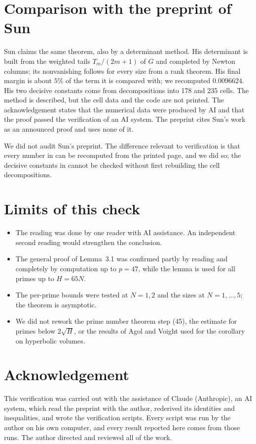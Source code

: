 \documentclass[11pt]{article}
\begin{document}
\section{Comparison with the preprint of Sun}

Sun \cite{Sun} claims the same theorem, also by a determinant method. His determinant is built from the weighted tails $T_m/(2m+1)$ of $G$ and completed by Newton columns; its nonvanishing follows for every size from a rank theorem. His final margin is about $5\%$ of the term it is compared with; we recomputed $0.0096624$. His two decisive constants come from decompositions into 178 and 235 cells. The method is described, but the cell data and the code are not printed. The acknowledgement states that the numerical data were produced by AI and that the proof passed the verification of an AI system. The preprint \cite{OAI} cites Sun's work as an announced proof and uses none of it.

We did not audit Sun's preprint. The difference relevant to verification is that every number in \cite{OAI} can be recomputed from the printed page, and we did so; the decisive constants in \cite{Sun} cannot be checked without first rebuilding the cell decompositions.

\section{Limits of this check}
\label{sec:limits}

\begin{itemize}
\item The reading was done by one reader with AI assistance. An independent second reading would strengthen the conclusion.
\item The general proof of Lemma~3.1 was confirmed partly by reading and completely by computation up to $p=47$, while the lemma is used for all primes up to $H=65N$.
\item The per-prime bounds were tested at $N=1,2$ and the sizes at $N=1,\dots,5$; the theorem is asymptotic.
\item We did not rework the prime number theorem step (45), the estimate for primes below $2\sqrt{H}$, or the results of Agol \cite{Agol} and Voight \cite{Voight} used for the corollary on hyperbolic volumes.
\end{itemize}

\section*{Acknowledgement}
This verification was carried out with the assistance of Claude (Anthropic), an AI system, which read the preprint with the author, rederived its identities and inequalities, and wrote the verification scripts. Every script was run by the author on his own computer, and every result reported here comes from those runs. The author directed and reviewed all of the work.
\end{document}
